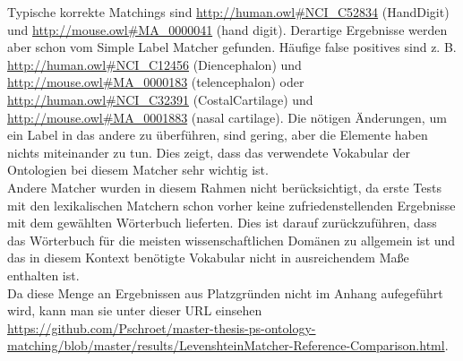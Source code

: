 		Typische korrekte Matchings sind \url{http://human.owl#NCI_C52834}
		(Hand\textunderscore Digit) und
		\url{http://mouse.owl#MA_0000041} (hand digit). Derartige Ergebnisse werden
		aber schon vom Simple Label Matcher gefunden. Häufige false positives sind
		z. B. \url{http://human.owl#NCI_C12456} (Diencephalon) und
		\url{http://mouse.owl#MA_0000183} (telencephalon) oder
		\url{http://human.owl#NCI_C32391} (Costal\textunderscore Cartilage) und
		\url{http://mouse.owl#MA_0001883} (nasal cartilage). Die nötigen Änderungen,
		um ein Label in das andere zu überführen, sind gering, aber die Elemente haben
		nichts miteinander zu tun. Dies zeigt, dass das verwendete Vokabular der
		Ontologien bei diesem Matcher sehr wichtig ist.\\
		Andere Matcher wurden in diesem Rahmen nicht berücksichtigt, da erste Tests
		mit den lexikalischen Matchern schon vorher keine zufriedenstellenden
		Ergebnisse mit dem gewählten Wörterbuch lieferten.
		Dies ist darauf zurückzuführen, dass das Wörterbuch für die meisten
		wissenschaftlichen Domänen zu allgemein ist und das in diesem Kontext
		benötigte Vokabular nicht in ausreichendem Maße enthalten ist.\\
		Da diese Menge an Ergebnissen aus Platzgründen nicht im Anhang aufegeführt
		wird, kann man sie unter dieser URL einsehen
		\url{https://github.com/Pschroet/master-thesis-ps-ontology-matching/blob/master/results/LevenshteinMatcher-Reference-Comparison.html}.
		
		\pagebreak[4]